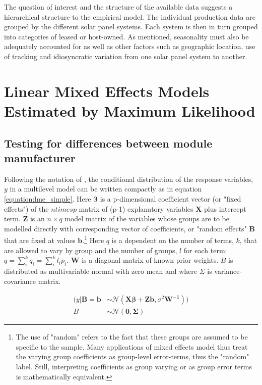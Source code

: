 \documentclass[12pt]{article}
\begin{document}
The question of interest and the structure of the available data suggests a hierarchical structure to the empirical model. The individual production data are grouped by the different solar panel systems. Each system is then in turn grouped into categories of leased or host-owned. As mentioned, seasonality must also be adequately accounted for as well as other factors such as geographic location, use of tracking and idiosyncratic variation from one solar panel system to another.

\section{Linear Mixed Effects Models Estimated by Maximum Likelihood}

\subsection{Testing for differences between module manufacturer}
Following the notation of \citet{bates_fitting_2015}, the conditional distribution of the response variables, $y$ in a multilevel model can be written compactly as in equation \ref{equation:lme_simple}. Here $\mathbf{\beta}$ is a p-dimensional coefficient vector (or "fixed effects") of the $n times p$ matrix of (p-1) explanatory variables $\mathbf{X}$ plus intercept term. $\mathbf{Z}$ is an $n \times q$ model matrix of the variables whose groups are to be modelled directly with corresponding vector of coefficients, or "random effects" $\mathbf{B}$ that are fixed at values $\mathbf{b}$.\footnote{The use of "random" refers to the fact that these groups are assumed to be specific to the sample. Many applications of mixed effects model thus treat the varying group coefficients as group-level error-terms, thus the "random" label. Still, interpreting coefficients as group varying or as group error terms is mathematically equivalent.} Here $q$ is a dependent on the number of terms, $k$, that are allowed to vary by group and the number of groups, $l$ for each term: $q=\sum_i^k q_i = \sum_i^k l_i p_i$.  $\mathbf{W}$ is a diagonal matrix of known prior weights. $B$ is distributed as multivariable normal with zero mean and where $\Sigma$ is variance-covariance matrix.

\begin{align}
(y|\mathbf{B=b} &\sim \mathcal{N}(\mathbf{X\beta + Zb}, \sigma^2\mathbf{W^{-1}}))\\
B &\sim \mathcal{N}(\mathbf{0,\Sigma})
\label{equation:lme_simple}
\end{align}
\end{document}
